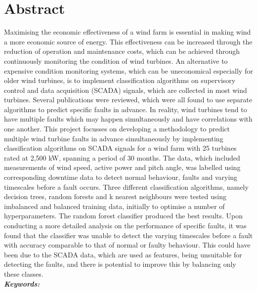 \chapter*{Abstract}

Maximising the economic effectiveness of a wind farm is essential in making wind a more economic source of energy. This effectiveness can be increased through the reduction of operation and maintenance costs, which can be achieved through continuously monitoring the condition of wind turbines. An alternative to expensive condition monitoring systems, which can be uneconomical especially for older wind turbines, is to implement classification algorithms on supervisory control and data acquisition (SCADA) signals, which are collected in most wind turbines. Several publications were reviewed, which were all found to use separate algorithms to predict specific faults in advance. In reality, wind turbines tend to have multiple faults which may happen simultaneously and have correlations with one another. This project focusses on developing a methodology to predict multiple wind turbine faults in advance simultaneously by implementing classification algorithms on SCADA signals for a wind farm with 25 turbines rated at 2,500 kW, spanning a period of 30 months. The data, which included measurements of wind speed, active power and pitch angle, was labelled using corresponding downtime data to detect normal behaviour, faults and varying timescales before a fault occurs. Three different classification algorithms, namely decision trees, random forests and k nearest neighbours were tested using imbalanced and balanced training data, initially to optimise a number of hyperparameters. The random forest classifier produced the best results. Upon conducting a more detailed analysis on the performance of specific faults, it was found that the classifier was unable to detect the varying timescales before a fault with accuracy comparable to that of normal or faulty behaviour. This could have been due to the SCADA data, which are used as features, being unsuitable for detecting the faults, and there is potential to improve this by balancing only these classes.
\\[.5cm]
\noindent\textbf{\textit{Keywords:}} \keywords

